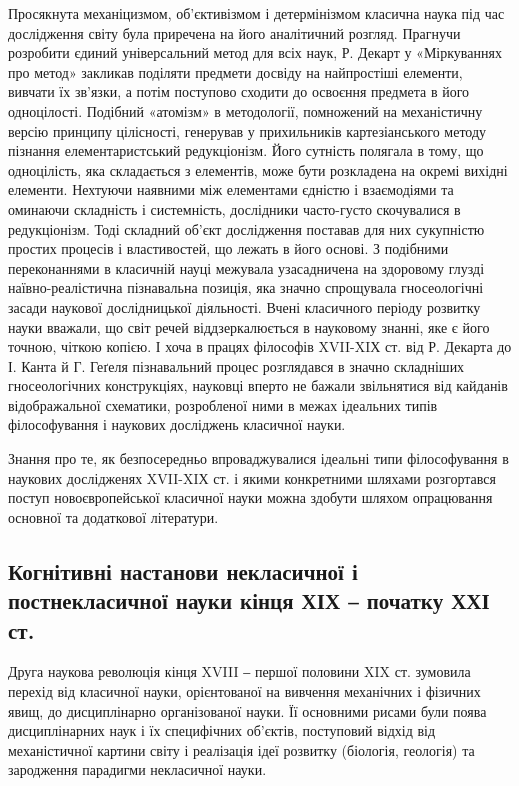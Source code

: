 Просякнута механіцизмом, об’єктивізмом і детермінізмом класична наука
під час дослідження світу була приречена на його аналітичний розгляд.
Прагнучи розробити єдиний універсальний метод для всіх наук, Р. Декарт у
«Міркуваннях про метод» закликав поділяти предмети досвіду на найпростіші
елементи, вивчати їх зв’язки, а потім поступово сходити до освоєння предмета
в його одноцілості. Подібний «атомізм» в методології, помножений на
механістичну версію принципу цілісності, генерував у прихильників
картезіанського методу пізнання елементаристський редукціонізм. Його
сутність полягала в тому, що одноцілість, яка складається з елементів, може
бути розкладена на окремі вихідні елементи. Нехтуючи наявними між
елементами єдністю і взаємодіями та оминаючи складність і системність,
дослідники часто-густо скочувалися в редукціонізм. Тоді складний об’єкт
дослідження поставав для них сукупністю простих процесів і властивостей, що
лежать в його основі. З подібними переконаннями в класичній науці межувала
узасадничена на здоровому глузді наївно-реалістична пізнавальна позиція, яка
значно спрощувала гносеологічні засади наукової дослідницької діяльності.
Вчені класичного періоду розвитку науки вважали, що світ речей
віддзеркалюється в науковому знанні, яке є його точною, чіткою копією. І хоча
в працях філософів XVII-XIХ ст. від Р. Декарта до І. Канта й Г. Геґеля
пізнавальний процес розглядався в значно складніших гносеологічних
конструкціях, науковці вперто не бажали звільнятися від кайданів
відображальної схематики, розробленої ними в межах ідеальних типів
філософування і наукових досліджень класичної науки.

Знання про те, як безпосередньо впроваджувалися ідеальні типи
філософування в наукових дослідженях XVII-XIХ ст. і якими конкретними
шляхами розгортався поступ новоєвропейської класичної науки можна здобути
шляхом опрацювання основної та додаткової літератури.

\subsection[Когнітивні настанови не- і постне-класичної науки ХІХ --- ХХІ ст.]{Когнітивні настанови некласичної і постнекласичної науки кінця ХІХ ‒ початку ХХІ ст.}
Друга наукова революція кінця XVIII ‒ першої
половини XIX ст. зумовила перехід від класичної науки, орієнтованої на
вивчення механічних і фізичних явищ, до дисциплінарно організованої науки. Її
основними рисами були поява дисциплінарних наук і їх специфічних об’єктів,
поступовий відхід від механістичної картини світу і реалізація ідеї розвитку
(біологія, геологія) та зародження парадигми некласичної науки.

